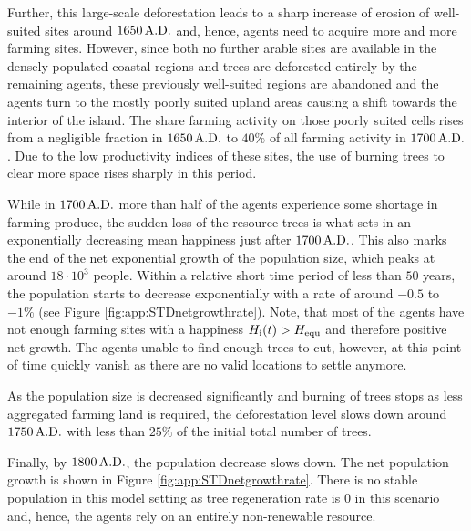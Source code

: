 Further, this large-scale deforestation leads to a sharp increase of erosion of well-suited sites around $1650\, {\rm A.D.}$ and, hence, agents need to acquire more and more farming sites.
However, since both no further arable sites are available in the densely populated coastal regions and trees are deforested entirely by the remaining agents, these previously well-suited regions are abandoned and the agents turn to the mostly poorly suited upland areas causing a shift towards the interior of the island.
The share farming activity on those poorly suited cells rises from a negligible fraction in $1650\, {\rm A.D.}$ to $40\%$ of all farming activity in $1700\,{\rm A.D.}$.
Due to the low productivity indices of these sites, the use of burning trees to clear more space rises sharply in this period.

While in $1700\,{\rm A.D.}$ more than half of the agents experience some shortage in farming produce, the sudden loss of the resource trees is what sets in an exponentially decreasing mean happiness just after $1700\, {\rm A.D.}$.
This also marks the end of the net exponential growth of the population size, which peaks at around $18\cdot 10^3$ people.
Within a relative short time period of less than $50$ years, the population starts to decrease exponentially with a rate of around $-0.5$ to $-1\%$ (see Figure \ref{fig:app:STDnetgrowthrate}).
Note, that most of the agents have not enough farming sites with a happiness $H_{\rm i}(t)>H_{\rm equ}$ and therefore positive net growth. 
The agents unable to find enough trees to cut, however, at this point of time quickly vanish as there are no valid locations to settle anymore.

As the population size is decreased significantly and burning of trees stops as less aggregated farming land is required, the deforestation level slows down around $1750\, {\rm A.D.}$ with less than $25\%$ of the initial total number of trees. 

Finally, by $1800\,{\rm A.D.}$, the population decrease slows down. 
The net population growth is shown in Figure \ref{fig:app:STDnetgrowthrate}. 
There is no stable population in this model setting as tree regeneration rate is $0$ in this scenario and, hence, the agents rely on an entirely non-renewable resource.



